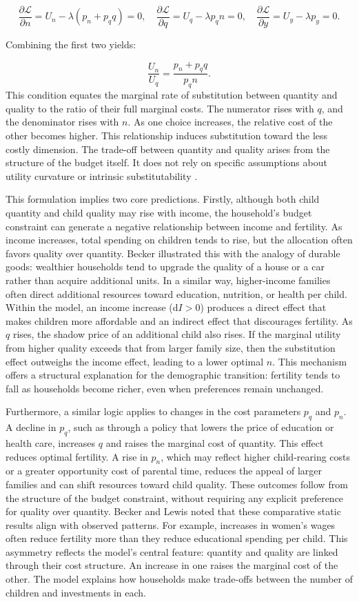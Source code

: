 \documentclass[]{AEA}
\begin{document}
\[
\frac{\partial \mathcal{L}}{\partial n} = U_n - \lambda(p_n + p_q q) = 0, \quad
\frac{\partial \mathcal{L}}{\partial q} = U_q - \lambda p_q n = 0, \quad
\frac{\partial \mathcal{L}}{\partial y} = U_y - \lambda p_y = 0.
\]

Combining the first two yields:

\[
\frac{U_n}{U_q} = \frac{p_n + p_q q}{p_q n}.
\] This condition equates the marginal rate of substitution between
quantity and quality to the ratio of their full marginal costs. The
numerator rises with \(q\), and the denominator rises with \(n\). As one
choice increases, the relative cost of the other becomes higher. This
relationship induces substitution toward the less costly dimension. The
trade-off between quantity and quality arises from the structure of the
budget itself. It does not rely on specific assumptions about utility
curvature or intrinsic substitutability \citep{becker1973interaction}.

This formulation implies two core predictions. Firstly, although both
child quantity and child quality may rise with income, the household's
budget constraint can generate a negative relationship between income
and fertility. As income increases, total spending on children tends to
rise, but the allocation often favors quality over quantity. Becker
illustrated this with the analogy of durable goods: wealthier households
tend to upgrade the quality of a house or a car rather than acquire
additional units. In a similar way, higher-income families often direct
additional resources toward education, nutrition, or health per child.
Within the model, an income increase (\(\mathrm{d}I > 0\)) produces a
direct effect that makes children more affordable and an indirect effect
that discourages fertility. As \(q\) rises, the shadow price of an
additional child also rises. If the marginal utility from higher quality
exceeds that from larger family size, then the substitution effect
outweighs the income effect, leading to a lower optimal \(n\). This
mechanism offers a structural explanation for the demographic
transition: fertility tends to fall as households become richer, even
when preferences remain unchanged.

Furthermore, a similar logic applies to changes in the cost parameters
\(p_q\) and \(p_n\). A decline in \(p_q\), such as through a policy that
lowers the price of education or health care, increases \(q\) and raises
the marginal cost of quantity. This effect reduces optimal fertility. A
rise in \(p_n\), which may reflect higher child-rearing costs or a
greater opportunity cost of parental time, reduces the appeal of larger
families and can shift resources toward child quality. These outcomes
follow from the structure of the budget constraint, without requiring
any explicit preference for quality over quantity. Becker and Lewis
noted that these comparative static results align with observed
patterns. For example, increases in women's wages often reduce fertility
more than they reduce educational spending per child. This asymmetry
reflects the model's central feature: quantity and quality are linked
through their cost structure. An increase in one raises the marginal
cost of the other. The model explains how households make trade-offs
between the number of children and investments in each.
\end{document}
